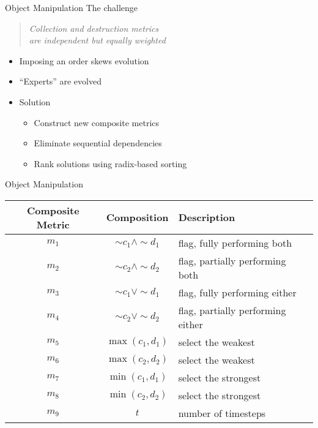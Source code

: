 \begin{slide}{Object Manipulation}
  The challenge 
  \vspace{3ex}
  \begin{center}
    \begin{quote}
      \centering
      \em Collection and destruction metrics \\
      are independent but equally weighted
    \end{quote}
  \end{center}
  \vspace{2ex}
  \begin{itemize}
  \item Imposing an order skews evolution
  \item ``Experts'' are evolved
  \item Solution
    \begin{itemize}
    \item Construct new composite metrics
    \item Eliminate sequential dependencies
    \item Rank solutions using radix-based sorting
    \end{itemize}
  \end{itemize}
\end{slide}


\begin{slide}{Object Manipulation}
  \centering
  \bigskip
  \begin{tabular}{c|c|l}
    Composite Metric & Composition & Description \\
    \hline
    $m_1$ & $\sim c_1 \wedge \sim d_1$ & flag, fully performing both \\
    $m_2$ & $\sim c_2 \wedge \sim d_2$ & flag, partially performing both \\
    $m_3$ & $\sim c_1 \vee \sim d_1$   & flag, fully performing either \\
    $m_4$ & $\sim c_2 \vee \sim d_2$   & flag, partially performing either \\
    $m_5$ & $\max(c_1,d_1)$ & select the weakest \\
    $m_6$ & $\max(c_2,d_2)$ & select the weakest \\
    $m_7$ & $\min(c_1,d_1)$ & select the strongest \\
    $m_8$ & $\min(c_2,d_2)$ & select the strongest \\
    $m_9$ & $t$ & number of timesteps \\
  \end{tabular}
\end{slide}

